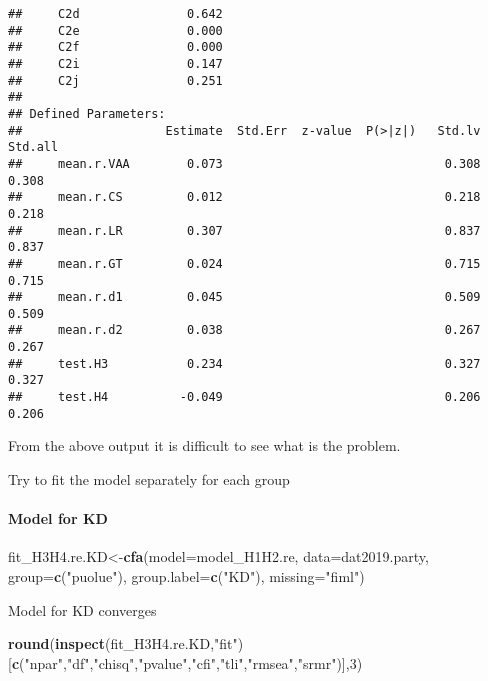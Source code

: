 \documentclass[
]{article}
\newenvironment{Shaded}{\begin{snugshade}}{\end{snugshade}}
\newcommand{\DataTypeTok}[1]{\textcolor[rgb]{0.13,0.29,0.53}{#1}}
\newcommand{\DecValTok}[1]{\textcolor[rgb]{0.00,0.00,0.81}{#1}}
\newcommand{\KeywordTok}[1]{\textcolor[rgb]{0.13,0.29,0.53}{\textbf{#1}}}
\newcommand{\NormalTok}[1]{#1}
\newcommand{\StringTok}[1]{\textcolor[rgb]{0.31,0.60,0.02}{#1}}
\begin{document}
\begin{verbatim}
##     C2d               0.642
##     C2e               0.000
##     C2f               0.000
##     C2i               0.147
##     C2j               0.251
## 
## Defined Parameters:
##                    Estimate  Std.Err  z-value  P(>|z|)   Std.lv  Std.all
##     mean.r.VAA        0.073                               0.308    0.308
##     mean.r.CS         0.012                               0.218    0.218
##     mean.r.LR         0.307                               0.837    0.837
##     mean.r.GT         0.024                               0.715    0.715
##     mean.r.d1         0.045                               0.509    0.509
##     mean.r.d2         0.038                               0.267    0.267
##     test.H3           0.234                               0.327    0.327
##     test.H4          -0.049                               0.206    0.206
\end{verbatim}

\newpage

From the above output it is difficult to see what is the problem.

Try to fit the model separately for each group

\newpage

\hypertarget{model-for-kd}{%
\paragraph{Model for KD}\label{model-for-kd}}

\begin{Shaded}
\begin{Highlighting}[]
\NormalTok{fit_H3H4.re.KD<-}\KeywordTok{cfa}\NormalTok{(}\DataTypeTok{model=}\NormalTok{model_H1H2.re,}
                    \DataTypeTok{data=}\NormalTok{dat2019.party,}
                    \DataTypeTok{group=}\KeywordTok{c}\NormalTok{(}\StringTok{"puolue"}\NormalTok{),}
                    \DataTypeTok{group.label=}\KeywordTok{c}\NormalTok{(}\StringTok{"KD"}\NormalTok{),}
                    \DataTypeTok{missing=}\StringTok{"fiml"}\NormalTok{)}
\end{Highlighting}
\end{Shaded}

Model for KD converges

\begin{Shaded}
\begin{Highlighting}[]
\KeywordTok{round}\NormalTok{(}\KeywordTok{inspect}\NormalTok{(fit_H3H4.re.KD,}\StringTok{"fit"}\NormalTok{)}
\NormalTok{      [}\KeywordTok{c}\NormalTok{(}\StringTok{"npar"}\NormalTok{,}\StringTok{"df"}\NormalTok{,}\StringTok{"chisq"}\NormalTok{,}\StringTok{"pvalue"}\NormalTok{,}\StringTok{"cfi"}\NormalTok{,}\StringTok{"tli"}\NormalTok{,}\StringTok{"rmsea"}\NormalTok{,}\StringTok{"srmr"}\NormalTok{)],}\DecValTok{3}\NormalTok{)}
\end{Highlighting}
\end{Shaded}
\end{document}
